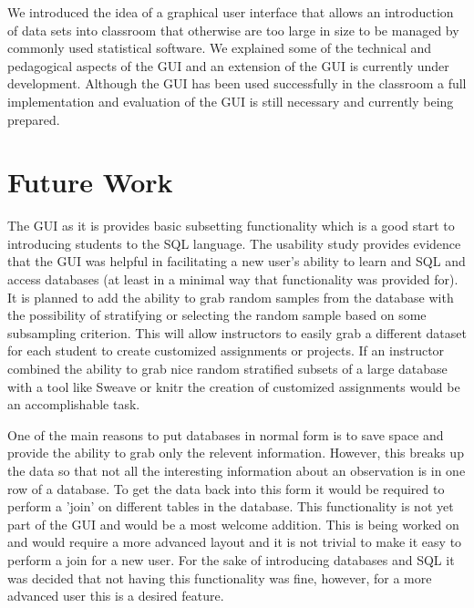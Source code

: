 \documentclass[11pt]{tise_style}
\begin{document}
We introduced the idea of a graphical user interface that allows an introduction of data sets into classroom that otherwise are too large in size to be managed by commonly used statistical software. We explained some of the technical and pedagogical aspects of the GUI and an extension of the GUI is currently under development. Although the GUI has been used successfully in the classroom a full implementation and evaluation of the GUI is still necessary and currently being prepared.


\section{{Future Work}}

The GUI as it is provides basic subsetting functionality which is a good start to introducing students to the SQL language.  The usability study provides evidence that the GUI was helpful in facilitating a new user's ability to learn and SQL and access databases (at least in a minimal way that functionality was provided for).  It is planned to add the ability to grab random samples from the database with the possibility of stratifying or selecting the random sample based on some subsampling criterion.  This will allow instructors to easily grab a different dataset for each student to create customized assignments or projects.  If an instructor combined the ability to grab nice random stratified subsets of a large database with a tool like Sweave or knitr \citep{knitr} the creation of customized assignments would be an accomplishable task.

One of the main reasons to put databases in normal form \citep{normalform:1983} is to save space and provide the ability to grab only the relevent information.  However, this breaks up the data so that not all the interesting information about an observation is in one row of a database.  To get the data back into this form it would be required to perform a 'join' on different tables in the database.  This functionality is not yet part of the GUI and would be a most welcome addition.  This is being worked on and would require a more advanced layout and it is not trivial to make it easy to perform a join for a new user.  For the sake of introducing databases and SQL it was decided that not having this functionality was fine, however, for a more advanced user this is a desired feature.

\newpage

{}
\end{document}
